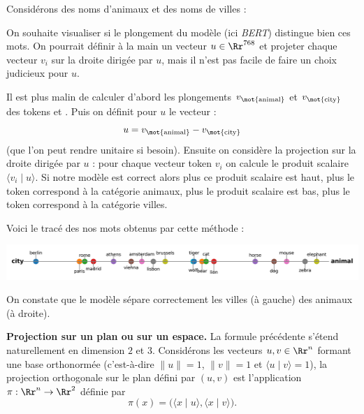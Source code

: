 \documentclass[11pt,class=report,crop=false]{standalone}
\begin{document}
\begin{exemple}
Considérons des noms d'animaux et des noms de villes :

On souhaite visualiser si le plongement du modèle (ici \emph{BERT}) distingue bien ces mots.
On pourrait définir à la main un vecteur $u \in \Rr^{768}$ et projeter chaque vecteur $v_i$ sur la droite dirigée par $u$, mais il n'est pas facile de faire un choix judicieux pour $u$.

Il est plus malin de calculer d'abord les plongements $v_{\text{\mot{animal}}}$ et 
$v_{\text{\mot{city}}}$ des tokens  et . Puis on définit pour $u$ le vecteur :
	$$u = v_{\text{\mot{animal}}} - v_{\text{\mot{city}}}$$
(que l'on peut rendre unitaire si besoin).
Ensuite on considère la projection sur la droite dirigée par $u$ :
pour chaque vecteur token $v_i$ on calcule le produit scalaire $\langle v_i \mid u \rangle$. Si notre modèle est correct alors plus ce produit scalaire est haut, plus le token correspond à la catégorie \og{}animaux\fg{}, plus le produit scalaire est bas, plus le token correspond à la catégorie \og{}villes\fg{}.

Voici le tracé des nos mots obtenus par cette méthode :

\begin{center}
	\includegraphics[scale=\myscale,scale=0.63]{figures/projection-droite}
\end{center}

On constate que le modèle sépare correctement les villes (à gauche) des animaux (à droite).
\end{exemple}


\bigskip

\textbf{Projection sur un plan ou sur un espace.}
La formule précédente s'étend naturellement en dimension $2$ et $3$.
Considérons les vecteurs $u,v \in \Rr^n$ formant une base orthonormée (c'est-à-dire $\|u\| = 1$, $\|v\| = 1$ et $\langle u \mid v \rangle =1$), la projection orthogonale sur le plan défini par $(u,v)$ est l'application $\pi : \Rr^n \to \Rr^2$ définie par 
$$\pi(x) = \big(\langle x \mid u \rangle, \langle x \mid v \rangle\big).$$
\end{document}
